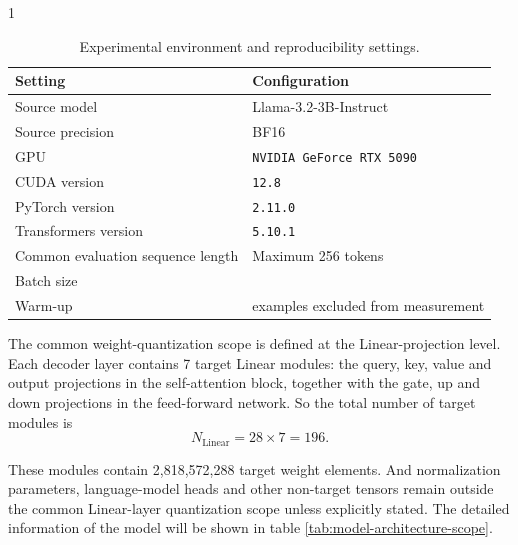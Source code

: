 \begin{table}[htbp]
\centering
\caption{Experimental environment and reproducibility settings.}
\label{tab:experimental-environment}

\begin{spacing}{1}
\small
\renewcommand{\arraystretch}{1.20}

\begin{tabularx}{\textwidth}{@{}
>{\raggedright\arraybackslash}p{}
>{\raggedright\arraybackslash}X
@{}}
\toprule
\textbf{Setting} & \textbf{Configuration} \\
\midrule

Source model &
Llama-3.2-3B-Instruct \\

Source precision &
BF16 \\

GPU &
\texttt{NVIDIA GeForce RTX 5090} \\

CUDA version &
\texttt{12.8} \\

PyTorch version &
\texttt{2.11.0} \\

Transformers version &
\texttt{5.10.1} \\

Common evaluation sequence length &
Maximum 256 tokens \\

Batch size &
1 \\

Warm-up &
3 examples excluded from measurement \\

\bottomrule
\end{tabularx}
\end{spacing}
\end{table}

The common weight-quantization scope is defined at the Linear-projection level. Each decoder layer contains 7 target Linear modules: the query, key, value and output projections in the self-attention block, together with the gate, up and down projections in the feed-forward network. So the total number of target modules is 
\begin{equation}
N_{\mathrm{Linear}}
=
28 \times 7
=
196 .
\label{eq:number-linear-modules}
\end{equation}

These modules contain 2,818,572,288 target weight elements. And normalization parameters, language-model heads and other non-target tensors remain outside the common Linear-layer quantization scope unless explicitly stated. The detailed information of the model will be shown in table \ref{tab:model-architecture-scope}.

